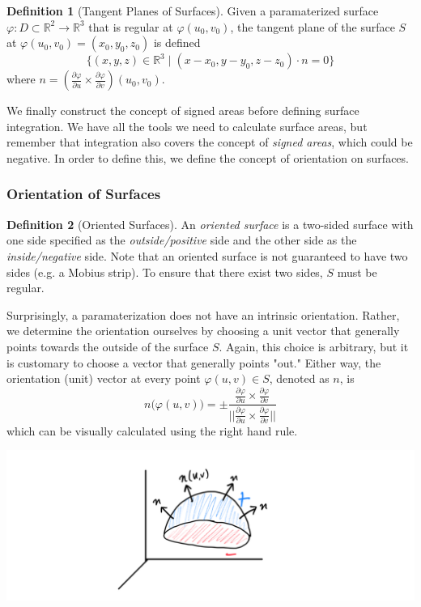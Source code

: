 \documentclass{article}
\theoremstyle{remark}
\theoremstyle{definition}
\newtheorem{definition}{Definition}[section]
\begin{document}
\begin{definition}[Tangent Planes of Surfaces]
Given a paramaterized surface $\varphi: D \subset \mathbb{R}^2 \longrightarrow \mathbb{R}^3$ that is regular at $\varphi(u_0, v_0)$, the tangent plane of the surface $S$ at $\varphi(u_0, v_0) = (x_0, y_0, z_0)$ is defined
\[\{(x, y, z) \in \mathbb{R}^3 \;|\; (x-x_0, y-y_0, z-z_0) \cdot n = 0\}\]
where $n = (\frac{\partial \varphi}{\partial u} \times \frac{\partial \varphi}{\partial v})(u_0, v_0)$. 
\end{definition}

We finally construct the concept of signed areas before defining surface integration. 
We have all the tools we need to calculate surface areas, but remember that integration also covers the concept of \textit{signed areas}, which could be negative. In order to define this, we define the concept of orientation on surfaces. 

\subsubsection{Orientation of Surfaces}

\begin{definition}[Oriented Surfaces]
An \textit{oriented surface} is a two-sided surface with one side specified as the \textit{outside/positive} side and the other side as the \textit{inside/negative} side. Note that an oriented surface is not guaranteed to have two sides (e.g. a Mobius strip). To ensure that there exist two sides, $S$ must be regular. 

Surprisingly, a paramaterization does not have an intrinsic orientation. Rather, we determine the orientation ourselves by choosing a unit vector that generally points towards the outside of the surface $S$. Again, this choice is arbitrary, but it is customary to choose a vector that generally points "out." Either way, the orientation (unit) vector at every point $\varphi(u, v) \in S$, denoted as $n$, is 
\[n\big(\varphi(u, v)\big) = \pm \frac{\frac{\partial \varphi}{\partial u} \times \frac{\partial \varphi}{\partial v}}{\big|\big|\frac{\partial \varphi}{\partial u} \times \frac{\partial \varphi}{\partial v}\big|\big|}\]
which can be visually calculated using the right hand rule. 
\begin{center}
    \includegraphics[scale=0.23]{img/Orientation_Unit_Vector.PNG}
\end{center}
\end{definition}
\end{document}

